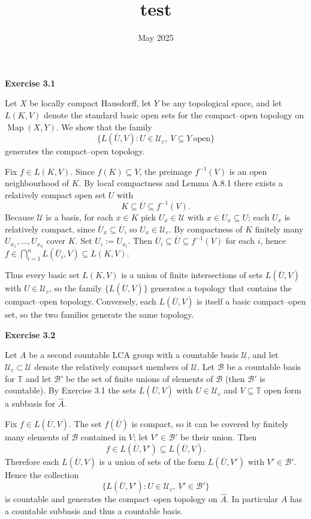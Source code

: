 \documentclass{article}
\title{test}
\date{May 2025}
\begin{document}
\vspace{0.5cm}

\textbf{Exercise 3.1}

\vspace{0.5cm}

Let $X$ be locally compact Hausdorff, let $Y$ be any topological space, and let $L(K,V)$ denote the standard basic open sets for the compact–open topology on $\operatorname{Map}(X,Y)$. We show that the family
\[
\{L(\overline U,V) : U\in\mathcal U_c,\ V\subseteq Y\ \text{open}\}
\]
generates the compact–open topology.

Fix $f\in L(K,V)$. Since $f(K)\subseteq V$, the preimage $f^{-1}(V)$ is an open neighbourhood of $K$. By local compactness and Lemma A.8.1 there exists a relatively compact open set $U$ with
\[
K\subseteq \overline U \subseteq f^{-1}(V).
\]
Because $\mathcal U$ is a basis, for each $x\in K$ pick $U_x\in\mathcal U$ with $x\in U_x\subseteq U$; each $U_x$ is relatively compact, since $\overline U_x \subseteq \overline U$, so $U_x\in\mathcal U_c$. By compactness of $K$ finitely many $U_{x_1},\dots,U_{x_n}$ cover $K$. Set $U_i:=U_{x_i}$. Then $\overline U_i\subseteq\overline U\subseteq f^{-1}(V)$ for each $i$, hence $f\in\bigcap_{i=1}^n L(\overline U_i,V)\subseteq L(K,V)$.

Thus every basic set $L(K,V)$ is a union of finite intersections of sets $L(\overline U,V)$ with $U\in\mathcal U_c$, so the family $\{L(\overline U,V)\}$ generates a topology that contains the compact–open topology. Conversely, each $L(\overline U,V)$ is itself a basic compact–open set, so the two families generate the same topology.

\vspace{0.5cm}

\textbf{Exercise 3.2}

\vspace{0.5cm}

Let $A$ be a second countable LCA group with a countable basis $\mathcal U$, and let $\mathcal U_c\subset\mathcal U$ denote the relatively compact members of $\mathcal U$. Let $\mathcal B$ be a countable basis for $\mathbb T$ and let $\mathcal B'$ be the set of finite unions of elements of $\mathcal B$ (then $\mathcal B'$ is countable). By Exercise 3.1 the sets $L(\overline U,V)$ with $U\in\mathcal U_c$ and $V\subseteq\mathbb T$ open form a subbasis for $\widehat A$.

Fix $f\in L(\overline U,V)$. The set $f(\overline U)$ is compact, so it can be covered by finitely many elements of $\mathcal B$ contained in $V$; let $V'\in\mathcal B'$ be their union. Then
\[
f\in L(\overline U,V')\subseteq L(\overline U,V).
\]
Therefore each $L(\overline U,V)$ is a union of sets of the form $L(\overline U,V')$ with $V'\in\mathcal B'$. Hence the collection
\[
\{L(\overline U,V') : U\in\mathcal U_c,\ V'\in\mathcal B'\}
\]
is countable and generates the compact–open topology on $\widehat A$. In particular $\widehat A$ has a countable subbasis and thus a countable basis.
\end{document}
